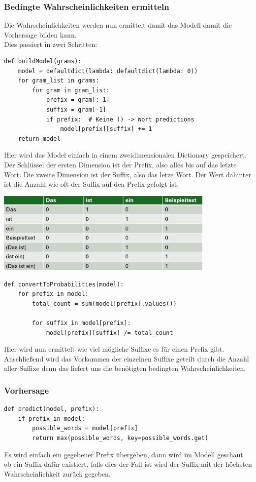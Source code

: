 \documentclass[12pt]{article}
\begin{document}
\subsubsection{Bedingte Wahrscheinlichkeiten ermitteln}
\quad Die Wahrscheinlichkeiten werden nun ermittelt damit das Modell damit die Vorhersage bilden kann.
\\Dies passiert in zwei Schritten:
\begin{lstlisting}
def buildModel(grams):
    model = defaultdict(lambda: defaultdict(lambda: 0))
    for gram_list in grams:
        for gram in gram_list:
            prefix = gram[:-1]
            suffix = gram[-1]
            if prefix:  # Keine () -> Wort predictions
                model[prefix][suffix] += 1
    return model
\end{lstlisting}
Hier wird das Model einfach in einem zweidimensionalen Dictionary gespeichert. Der Schlüssel der ersten Dimension ist der Prefix, also alles bis auf das letzte Wort. Die zweite Dimension ist der Suffix, also das letze Wort. Der Wert dahinter ist die Anzahl wie oft der Suffix auf den Prefix gefolgt ist.
\cite{saylordotorg}
\begin{center}
	\includegraphics[width=0.8\textwidth]{statics/Furitsch/table.PNG}
\end{center}
\begin{lstlisting}
def convertToProbabilities(model):
    for prefix in model:
        total_count = sum(model[prefix].values())

        for suffix in model[prefix]:
            model[prefix][suffix] /= total_count
\end{lstlisting}
Hier wird nun ermittelt wie viel mögliche Suffixe es für einen Prefix gibt. Anschließend wird das Vorkommen der einzelnen Suffixe geteilt durch die Anzahl aller Suffixe denn das liefert uns die benötigten bedingten Wahrscheinlichkeiten.
\cite{jurafsky}
\subsubsection{Vorhersage}
\begin{lstlisting}
def predict(model, prefix):
    if prefix in model:
        possible_words = model[prefix]
        return max(possible_words, key=possible_words.get)
\end{lstlisting}
Es wird einfach ein gegebener Prefix übergeben, dann wird im Modell geschaut ob ein Suffix dafür existiert, falls dies der Fall ist wird der Suffix mit der höchsten Wahrscheinlichkeit zurück gegeben.
\end{document}
